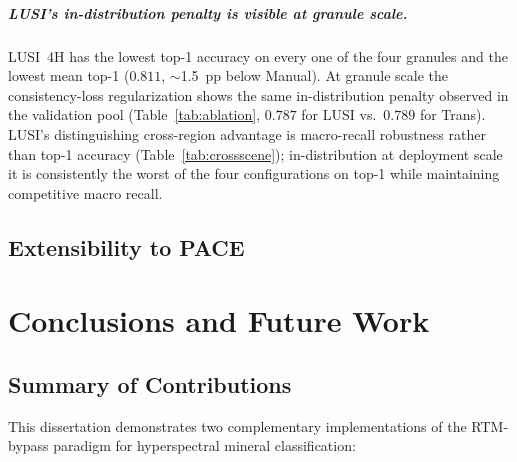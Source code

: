 \documentclass[11pt]{report}
\begin{document}
\paragraph{LUSI's in-distribution penalty is visible at granule scale.}
LUSI~4H has the lowest top-1 accuracy on every one of the four granules and the lowest mean top-1 ($0.811$, $\sim$1.5~pp below Manual). At granule scale the consistency-loss regularization shows the same in-distribution penalty observed in the validation pool (Table~\ref{tab:ablation}, $0.787$ for LUSI vs.\ $0.789$ for Trans). LUSI's distinguishing cross-region advantage is macro-recall robustness rather than top-1 accuracy (Table~\ref{tab:crossscene}); in-distribution at deployment scale it is consistently the worst of the four configurations on top-1 while maintaining competitive macro recall.

\section{Extensibility to PACE}
\label{sec:pace_transformer}



\chapter{Conclusions and Future Work}
\label{chap:conclusions}

\section{Summary of Contributions}

This dissertation demonstrates two complementary implementations of the RTM-bypass paradigm for hyperspectral mineral classification:
\end{document}
